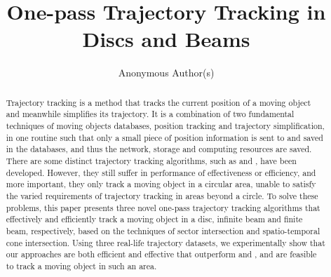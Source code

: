 \documentclass[sigconf,nonacm]{acmart}
\newcommand{\ldrh}{\kw{LDRH}}
\newcommand{\grts}{\kw{GRTS}}
\begin{document}
\title{One-pass Trajectory Tracking in Discs and Beams}




\author{Anonymous Author(s)}



\pagestyle{empty} %



\begin{abstract}
Trajectory tracking is a method that tracks the current position of a moving object and meanwhile simplifies its trajectory. It is a combination of two fundamental techniques of moving objects databases, position tracking and trajectory simplification, in one routine such that only a small piece of position information is sent to and saved in the databases, and thus the network, storage and computing resources are saved.
%
There are some distinct trajectory tracking algorithms, such as \ldrh and \grts, have been developed. However, they still suffer in performance of effectiveness or efficiency, and more important, they only track a moving object in a circular area, unable to satisfy the varied requirements of trajectory tracking in areas beyond a circle. 
%
To solve these problems, this paper presents three novel one-pass trajectory tracking algorithms that effectively and efficiently track a moving object in a disc, infinite beam and finite beam, respectively, based on the techniques of sector intersection and spatio-temporal cone intersection.
%
Using three real-life trajectory datasets, we experimentally show that our approaches are both efficient and effective that outperform \ldrh and \grts, and are feasible to track a moving object in such an area.
\end{abstract}
\end{document}
